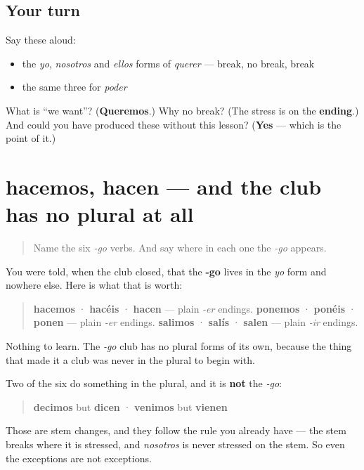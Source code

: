 \subsection*{Your turn}
Say these aloud:

\begin{itemize}
\raggedright
  \item the \emph{yo}, \emph{nosotros} and \emph{ellos} forms of \emph{querer} — break, no break, break
  \item the same three for \emph{poder}
\end{itemize}

\begin{tcolorbox}[breakable,colback=teal!4,colframe=teal!35!black,title={Before you move on}]
What is \textquotedblleft{}we want\textquotedblright{}? (\textbf{Queremos}.) Why no break? (The stress is on the \textbf{ending}.) And could you have produced these without this lesson? (\textbf{Yes} — which is the point of it.)
\end{tcolorbox}
\section[hacemos · hacen]{hacemos, hacen — and the club has no plural at all}

\label{lesson:ES-C13-plurales-yo-go}



\begin{quote}
Name the six \emph{-go} verbs. And say where in each one the \emph{-go} appears.
\end{quote}

\begin{grammarlens}[title={Grammar Lens: an oddity that was only ever in one slot}]
You were told, when the club closed, that the \textbf{-go} lives in the \emph{yo} form and nowhere else. Here is what that is worth:

\begin{quote}
\textbf{hacemos} · \textbf{hacéis} · \textbf{hacen} — plain \emph{-er} endings. \textbf{ponemos} · \textbf{ponéis} · \textbf{ponen} — plain \emph{-er} endings. \textbf{salimos} · \textbf{salís} · \textbf{salen} — plain \emph{-ir} endings.
\end{quote}

Nothing to learn. The \emph{-go} club has no plural forms of its own, because the thing that made it a club was never in the plural to begin with.

Two of the six do something in the plural, and it is \textbf{not} the \emph{-go}:

\begin{quote}
\textbf{decimos} but \textbf{dicen} · \textbf{venimos} but \textbf{vienen}
\end{quote}

Those are stem changes, and they follow the rule you already have — the stem breaks where it is stressed, and \emph{nosotros} is never stressed on the stem. So even the exceptions are not exceptions.
\end{grammarlens}

